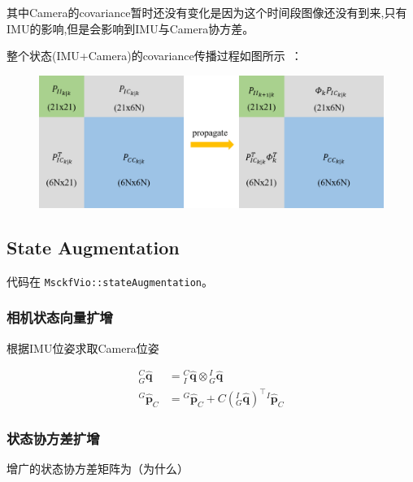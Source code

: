 \documentclass[12pt,a4paper]{article}
\begin{document}
其中Camera的covariance暂时还没有变化是因为这个时间段图像还没有到来,只有IMU的影响,但是会影响到IMU与Camera协方差。

整个状态(IMU+Camera)的covariance传播过程如图所示~\cite{xinliang-zhong-msckf_notes}：

\begin{figure}[!htbp]
\centering
\includegraphics[scale=0.6]{images/imu_propagate.png}
\end{figure}

\subsection{State Augmentation}

代码在 \verb|MsckfVio::stateAugmentation|。

\subsubsection{相机状态向量扩增}

根据IMU位姿求取Camera位姿

\begin{equation}
\begin{aligned}
{}^C_G\hat{\mathbf{q}} &= {}^C_I\hat{\mathbf{q}} \otimes {}^I_G\hat{\mathbf{q}} \\
{}^G\hat{\mathbf{p}}_C &= {}^G\hat{\mathbf{p}}_C + C\left({}^I_G\hat{\mathbf{q}}\right)^\top {}^I\hat{\mathbf{p}}_C
\end{aligned}
\end{equation}

\subsubsection{状态协方差扩增}

增广的状态协方差矩阵为（{\color{red}为什么}）
\end{document}

